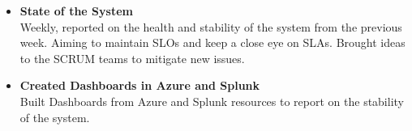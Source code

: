 \documentclass[a4paper]{mctemplate} %
\begin{document}
\begin{main}
\begin{itemize}
    
    \item \textbf{State of the System}
    \hfill \\
    \newline
    Weekly, reported on the health and stability of the system from the previous week. Aiming to maintain SLOs and keep a close eye on SLAs. Brought ideas to the SCRUM teams to mitigate new issues.
    
    \item \textbf{Created Dashboards in Azure and Splunk}
    \hfill \\
    \newline
    {Built Dashboards from Azure and Splunk resources to report on the stability of the system. 
    }

    \vspace{.3cm}
\end{itemize}

\end{main}
\end{document}
